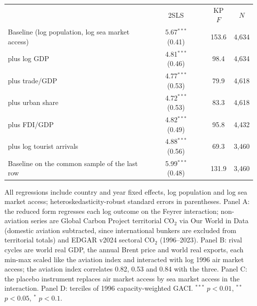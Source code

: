 \documentclass[12pt]{article}
\begin{document}
\begin{table}[htbp]
\begin{threeparttable}
\begin{tabular}{lcccc}
 & 2SLS & & KP $F$ & $N$ \\
  Baseline (log population, log sea market access) & 5.67$^{***}$ (0.41) & & 153.6 & 4,634 \\
  \quad plus log GDP & 4.81$^{***}$ (0.46) & & 98.4 & 4,634 \\
  \quad plus trade/GDP & 4.77$^{***}$ (0.53) & & 79.9 & 4,618 \\
  \quad plus urban share & 4.72$^{***}$ (0.53) & & 83.3 & 4,618 \\
  \quad plus FDI/GDP & 4.82$^{***}$ (0.49) & & 95.8 & 4,432 \\
  \quad plus log tourist arrivals & 4.88$^{***}$ (0.56) & & 69.3 & 3,460 \\
  Baseline on the common sample of the last row & 5.99$^{***}$ (0.48) & & 131.9 & 3,460 \\
\bottomrule
\end{tabular}
\begin{tablenotes}\scriptsize
\item All regressions include country and year fixed effects, log population and log sea market access; heteroskedasticity-robust standard errors in parentheses. Panel A: the reduced form regresses each log outcome on the Feyrer interaction; non-aviation series are Global Carbon Project territorial CO$_2$ via Our World in Data (domestic aviation subtracted, since international bunkers are excluded from territorial totals) and EDGAR v2024 sectoral CO$_2$ (1996--2023). Panel B: rival cycles are world real GDP, the annual Brent price and world real exports, each min-max scaled like the aviation index and interacted with log 1996 air market access; the aviation index correlates 0.82, 0.53 and 0.84 with the three. Panel C: the placebo instrument replaces air market access by sea market access in the interaction. Panel D: terciles of 1996 capacity-weighted GACI. $^{***}$ $p<0.01$, $^{**}$ $p<0.05$, $^{*}$ $p<0.1$.
\end{tablenotes}
\end{threeparttable}
\end{table}
\end{document}
